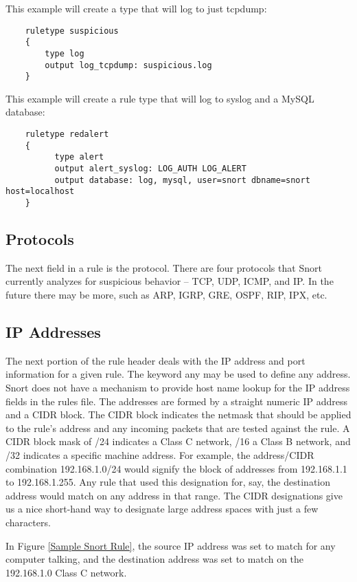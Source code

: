 \documentclass[english]{report}
\begin{document}
This example will create a type that will log to just tcpdump:

\begin{verbatim}
    ruletype suspicious
    {
        type log 
        output log_tcpdump: suspicious.log
    }
\end{verbatim}

This example will create a rule type that will log to syslog and a MySQL
database:

\begin{verbatim}
    ruletype redalert
    {
          type alert 
          output alert_syslog: LOG_AUTH LOG_ALERT 
          output database: log, mysql, user=snort dbname=snort host=localhost 
    }
\end{verbatim}

\subsection{Protocols}

The next field in a rule is the protocol. There are four protocols that Snort
currently analyzes for suspicious behavior -- TCP, UDP, ICMP, and IP. In the
future there may be more, such as ARP, IGRP, GRE, OSPF, RIP, IPX, etc.

\subsection{IP Addresses}

The next portion of the rule header deals with the IP address and port
information for a given rule. The keyword any may be used to define any
address. Snort does not have a mechanism to provide host name lookup for the IP
address fields in the rules file. The addresses are formed by a straight
numeric IP address and a CIDR\cite{cidrnotation} block. The CIDR block
indicates the netmask that should be applied to the rule's address and any
incoming packets that are tested against the rule. A CIDR block mask of /24
indicates a Class C network, /16 a Class B network, and /32 indicates a
specific machine address. For example, the address/CIDR combination
192.168.1.0/24 would signify the block of addresses from 192.168.1.1 to
192.168.1.255.  Any rule that used this designation for, say, the destination
address would match on any address in that range. The CIDR designations give us
a nice short-hand way to designate large address spaces with just a few
characters.

In Figure \ref{Sample Snort Rule}, the source IP address was set to match for
any computer talking, and the destination address was set to match on the
192.168.1.0 Class C network.
\end{document}
